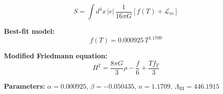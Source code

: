 
\begin{equation}
  S = \int d^4x \, |e| \, \frac{1}{16\pi G} \left[ f(T) + \mathcal{L}_m \right]
\end{equation}

\textbf{Best-fit model:}
\begin{equation}
  f(T) = 0.000925 \, T^{1.1709}
\end{equation}

\textbf{Modified Friedmann equation:}
\begin{equation}
  H^2 = \frac{8\pi G}{3} \rho - \frac{f}{6} + \frac{T f_T}{3}
\end{equation}

\textbf{Parameters:}
$\alpha = 0.000925$, \quad
$\beta = -0.050435$, \quad
$n = 1.1709$, \quad
$\Lambda_{\text{BI}} = 446.1915$